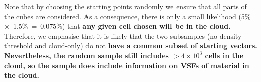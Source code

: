 Note that by choosing the starting points randomly we ensure that all parts of the cubes are considered. 
As a consequence, there is only a small likelihood (5\%~$\times$~1.5\%~=~0.075\%) that \textbf{any given cell chosen will be in the cloud.}
Therefore, we emphasise that it is likely that the two subsamples (no density threshold and cloud-only) do not \textbf{have a common subset of starting vectors.
Nevertheless, the random sample still includes $>4 \times 10^3$ cells in the cloud, so the sample does include information on VSFs of material in the cloud.}

\endinput
